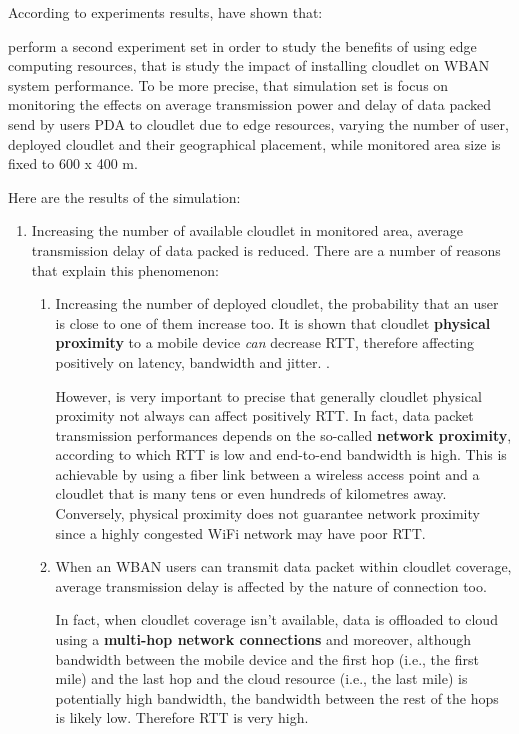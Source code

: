 \documentclass[sigchi]{acmart}
\begin{document}
According to experiments results, \cite{MSAReport} have shown that:




\citet{MSAReport} perform a second experiment set in order to study the benefits of using edge computing resources, that is study the impact of installing cloudlet on WBAN system performance. 
To be more precise, that simulation set is focus on monitoring the effects on average transmission power and delay of data packed send by users PDA to cloudlet due to edge resources, varying the number of user, deployed cloudlet and their geographical placement, while monitored area size is fixed to 600 x 400 m.

Here are the results of the simulation:

\begin{enumerate}

\item Increasing the number of available cloudlet in monitored area, average transmission delay of data packed is reduced. There are a number of reasons that explain this phenomenon:

\begin{enumerate}

\item Increasing the number of deployed cloudlet, the probability that an user is close to one of them increase too. It is shown that cloudlet \textbf{physical proximity} to a mobile device \textit{can} decrease RTT, therefore affecting positively on latency, bandwidth and jitter. \cite{TheEmergenceOfEdgeComputing}. 

However, is very important to precise that generally cloudlet physical proximity not always can affect positively RTT. In fact, data packet transmission performances depends on the so-called \textbf{network proximity}, according to which RTT is low and end-to-end bandwidth is high. This is achievable by using a fiber link between a wireless access point and a cloudlet that is many tens or even hundreds of kilometres away. Conversely, physical proximity does not guarantee network proximity since a highly congested WiFi network may have poor RTT.\cite{TheSeminalRoleEdgeNativeApplications}

\item When an WBAN users can transmit data packet within cloudlet coverage, average transmission delay is affected by the nature of connection too. 

In fact, when cloudlet coverage isn't available, data is offloaded to cloud using a \textbf{multi-hop network connections} and moreover, although bandwidth between the mobile device and the first hop (i.e., the first mile) and the last hop and the cloud resource (i.e., the last mile) is potentially high bandwidth, the bandwidth between the rest of the hops is likely low. Therefore RTT is very high.\cite{ArchitecturalTacticsCyberForaging}


\end{enumerate}
\end{enumerate}
\end{document}
